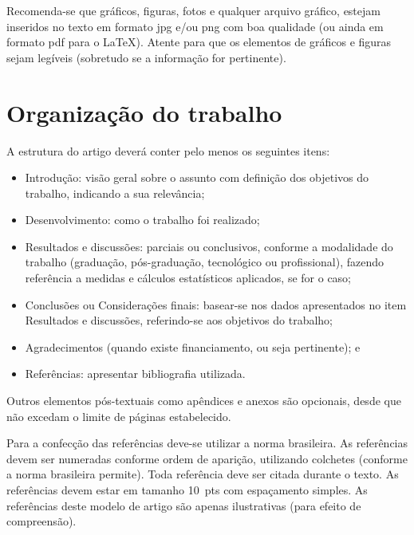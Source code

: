 \documentclass[12pt, a4paper, oneside, onecolumn] {article}%
\begin{document}
\hspace{\baselineskip}

Recomenda-se que gráficos, figuras, fotos e qualquer arquivo gráfico, estejam inseridos no texto em formato jpg e/ou png com boa qualidade (ou ainda em formato pdf para o \LaTeX\xspace). Atente para que os elementos de gráficos e figuras sejam legíveis (sobretudo se a informação for pertinente).

\section{Organização do trabalho}

A estrutura do artigo deverá conter pelo menos os seguintes itens:
%
\begin{itemize} \itemsep=5pt
	\item Introdução: visão geral sobre o assunto com definição dos objetivos do trabalho, indicando a sua relevância;
	\item Desenvolvimento: como o trabalho foi realizado;
	\item Resultados e discussões: parciais ou conclusivos, conforme a modalidade do trabalho (graduação, pós-graduação, tecnológico ou profissional), fazendo referência a medidas e cálculos estatísticos aplicados, se for o caso;
	\item Conclusões ou Considerações finais: basear-se nos dados apresentados no item Resultados e discussões, referindo-se aos objetivos do trabalho;
	\item Agradecimentos (quando existe financiamento, ou seja pertinente); e
	\item Referências: apresentar bibliografia utilizada.
\end{itemize}
%
Outros elementos pós-textuais como apêndices e anexos são opcionais, desde que não excedam o limite de páginas estabelecido. 

Para a confecção das referências deve-se utilizar a norma brasileira. As referências devem ser numeradas conforme ordem de aparição, utilizando colchetes \cite{Gomes-2015} (conforme a norma brasileira permite). Toda referência deve ser citada durante o texto. As referências devem estar em tamanho 10~pts com espaçamento simples. As referências \cite{Mareze-2017,Fonseca-2013,Brandao-2017,Gomes-2015,Oppenheim-2010,Muller-2001,Borges-2018} deste modelo de artigo são apenas ilustrativas (para efeito de compreensão). 
\end{document}
